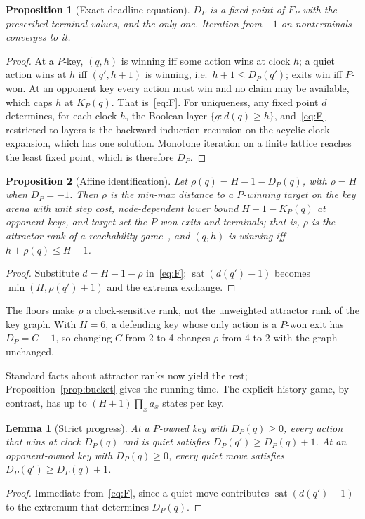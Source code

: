 \documentclass[journal]{IEEEtran}
\newtheorem{lemma}{Lemma}
\newtheorem{proposition}{Proposition}
\theoremstyle{definition}
\theoremstyle{remark}
\newcommand{\sat}{\operatorname{sat}}
\begin{document}
\begin{proposition}[Exact deadline equation]\label{prop:fix}
$D_P$ is a fixed point of $F_P$ with the prescribed terminal values, and the only one. Iteration from $-1$ on nonterminals converges to it.
\end{proposition}
\begin{proof}
At a $P$-key, $(q,h)$ is winning iff some action wins at clock $h$; a quiet action wins at $h$ iff $(q',h+1)$ is winning, i.e.\ $h+1\le D_P(q')$; exits win iff $P$-won. At an opponent key every action must win and no claim may be available, which caps $h$ at $K_P(q)$. That is~\eqref{eq:F}. For uniqueness, any fixed point $d$ determines, for each clock $h$, the Boolean layer $\{q: d(q)\ge h\}$, and~\eqref{eq:F} restricted to layers is the backward-induction recursion on the acyclic clock expansion, which has one solution. Monotone iteration on a finite lattice reaches the least fixed point, which is therefore $D_P$.
\end{proof}

\begin{proposition}[Affine identification]\label{prop:rank}
Let $\rho(q)=H-1-D_P(q)$, with $\rho=H$ when $D_P=-1$. Then $\rho$ is the min-max distance to a $P$-winning target on the key arena with unit step cost, node-dependent lower bound $H-1-K_P(q)$ at opponent keys, and target set the $P$-won exits and terminals; that is, $\rho$ is the attractor rank of a reachability game~\cite{gradel2002}, and $(q,h)$ is winning iff $h+\rho(q)\le H-1$.
\end{proposition}
\begin{proof}
Substitute $d=H-1-\rho$ in~\eqref{eq:F}; $\sat(d(q')-1)$ becomes $\min(H,\rho(q')+1)$ and the extrema exchange.
\end{proof}

The floors make $\rho$ a clock-sensitive rank, not the unweighted attractor rank of the key graph. With $H=6$, a defending key whose only action is a $P$-won exit has $D_P=C-1$, so changing $C$ from 2 to 4 changes $\rho$ from 4 to 2 with the graph unchanged.

Standard facts about attractor ranks now yield the rest; Proposition~\ref{prop:bucket} gives the running time. The explicit-history game, by contrast, has up to $(H+1)\prod_x a_x$ states per key.

\begin{lemma}[Strict progress]\label{lem:progress}
At a $P$-owned key with $D_P(q)\ge0$, every action that wins at clock $D_P(q)$ and is quiet satisfies $D_P(q')\ge D_P(q)+1$. At an opponent-owned key with $D_P(q)\ge0$, every quiet move satisfies $D_P(q')\ge D_P(q)+1$.
\end{lemma}
\begin{proof}
Immediate from~\eqref{eq:F}, since a quiet move contributes $\sat(d(q')-1)$ to the extremum that determines $D_P(q)$.
\end{proof}
\end{document}
